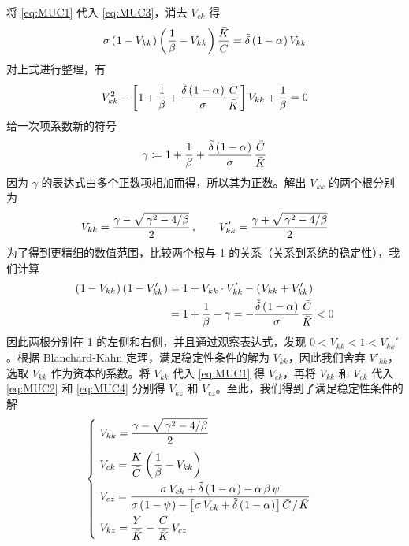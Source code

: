 将 \ref{eq:MUC1} 代入 \ref{eq:MUC3}，消去 \(V_{ck}\) 得
\begin{align*}
    \sigma\left(\mspace{1mu}1-V_{kk}\mspace{1mu}\right)\left(\mspace{1mu}\dfrac1\beta-V_{kk}\mspace{1mu}\right)\dfrac{\bar{K}}{\bar{C}}=\tilde\delta\left(\mspace{1mu}1-\alpha\mspace{1mu}\right)V_{kk}
\end{align*}
对上式进行整理，有
\begin{equation*}
    V^2_{kk}-\bks{1+\dfrac1\beta+\dfrac{\tilde\delta\bka{1-\alpha}}\sigma\,\dfracb{C}{K}}V_{kk}+\dfrac1\beta=0
\end{equation*}
给一次项系数新的符号
\begin{equation}
    \gamma\coloneq1+\dfrac1\beta+\dfrac{\tilde\delta\bka{1-\alpha}}\sigma\,\dfracb{C}{K}\label{eq:gamma}
\end{equation}
因为 \(\gamma\) 的表达式由多个正数项相加而得，所以其为正数。解出 \(V_{kk}\) 的两个根分别为
\begin{align}
    V_{kk}=\dfrac{\gamma-\dsq{\gamma^2-4/\beta}}{2}\,,\qquad V_{kk}'=\dfrac{\gamma+\dsq{\gamma^2-4/\beta}}{2}\label{eq:Vkk}
\end{align}
为了得到更精细的数值范围，比较两个根与 1 的关系（关系到系统的稳定性），我们计算
\begin{align*}
    \bka{1-V_{kk}}\bka{1-V_{kk}'}&=1+V_{kk}\cdot V_{kk}'-\bka{V_{kk}+V_{kk}'}\\
    &=1+\dfrac1\beta-\gamma=-\dfrac{\tilde\delta\bka{1-\alpha}}\sigma\,\dfracb{C}{K}<0
\end{align*}
因此两根分别在 1 的左侧和右侧，并且通过观察表达式，发现 \(0<V_{kk}<1<V_{kk}'\)。根据 Blanchard-Kahn 定理，满足稳定性条件的解为 \(V_{kk}\)，因此我们舍弃 \(V'_{kk}\)，选取 \(V_{kk}\) 作为资本的系数。将 \(V_{kk}\) 代入 \ref{eq:MUC1} 得 \(V_{ck}\)，再将 \(V_{kk}\) 和 \(V_{ck}\) 代入 \ref{eq:MUC2} 和 \ref{eq:MUC4} 分别得 \(V_{kz}\) 和 \(V_{cz}\)。至此，我们得到了满足稳定性条件的解
\begin{equation}
    \begin{cases}
        \ V_{kk}=\dfrac{\gamma-\dsq{\gamma^2-4/\beta}}{2}\\[2ex]
        \ V_{ck}=\dfracb{K}{C}\bka{\dfrac1\beta-V_{kk}}\\[2ex]
        \ V_{cz}=\dfrac{\sigma\,V_{ck}+\tilde\delta\bka{1-\alpha}-\alpha\,\beta\,\psi}{\sigma\bka{1-\psi}-\bks{\sigma\,V_{ck}+\tilde\delta\bka{1-\alpha}}{\bar C}\islash{\bar K}}\\[2ex]
        \ V_{kz}=\dfracb{Y}{K}-\dfracb{C}{K}\, V_{cz}
    \end{cases}\label{eq:V}
\end{equation}


